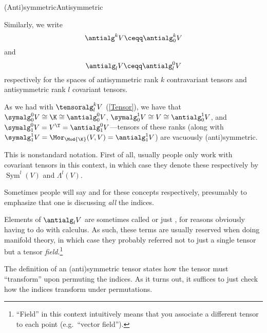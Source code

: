 \begin{dfn}{(Anti)symmetric}{Antisymmetric}
\begin{rmk}
		Similarly, we write
		\begin{equation}
			\antialg ^kV\ceqq \antialg _0^kV
		\end{equation}
		and
		\begin{equation}
			\antialg _lV\ceqq \antialg _l^0V
		\end{equation}
		respectively for the spaces of antisymmetric rank $k$ contravariant tensors and antisymmetric rank $l$ covariant tensors.
	\end{rmk}
	\begin{rmk}
		As we had with $\tensoralg _l^kV$ (\cref{Tensor}), we have that $\symalg _0^0V\cong \K \cong \antialg _0^0V$, $\symalg _0^1V\cong V\cong \antialg _0^1V$, and $\symalg _1^0V=V^{\T}=\antialg _1^0V$---tensors of these ranks (along with $\symalg _1^1V=\Mor _{\Mod{\K}}(V,V)=\antialg _1^1V$) are vacuously (anti)symmetric.
	\end{rmk}
	\begin{rmk}
		This is nonstandard notation.  First of all, usually people only work with covariant tensors in this context, in which case they denote these respectively by $\operatorname{Sym}^l(V)$ and $\Lambda ^l(V)$.
	\end{rmk}
	\begin{rmk}
		Sometimes people will say  and  for these concepts respectively, presumably to emphasize that one is discussing \emph{all} the indices.
	\end{rmk}
	\begin{rmk}
		Elements of $\antialg _lV$ are sometimes called  or just , for reasons obviously having to do with calculus.  As such, these terms are usually reserved when doing manifold theory, in which case they probably referred not to just a single tensor but a tensor \emph{field}.\footnote{``Field'' in this context intuitively means that you associate a different tensor to each point (e.g.~``vector field'').}
	\end{rmk}
\end{dfn}
The definition of an (anti)symmetric tensor states how the tensor must ``transform'' upon permuting the indices.  As it turns out, it suffices to just check how the indices transform under permutations.
